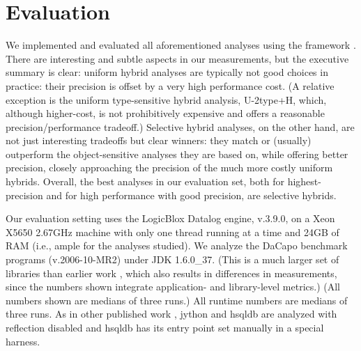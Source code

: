 

\section{Evaluation}
\label{sec:evaluation}

We implemented and evaluated all aforementioned analyses using the
\doop{} framework \cite{oopsla:2009:Bravenboer}. There are interesting and
subtle aspects in our measurements, but the executive summary is
clear: uniform hybrid analyses are typically not good choices in
practice: their precision is offset by a very high performance cost.
(A relative exception is the uniform type-sensitive hybrid analysis,
U-2type+H, which, although higher-cost, is not prohibitively expensive
and offers a reasonable precision/performance tradeoff.)  Selective
hybrid analyses, on the other hand, are not just interesting tradeoffs
but clear winners: they match or (usually) outperform the
object-sensitive analyses they are based on, while offering better
precision, closely approaching the precision of the much more costly
uniform hybrids. Overall, the best analyses in our evaluation set,
both for highest-precision and for high performance with good
precision, are selective hybrids.

Our evaluation setting uses the LogicBlox Datalog engine, v.3.9.0, on
a Xeon X5650 2.67GHz machine with only one thread running at a time
and 24GB of RAM (i.e., ample for the analyses studied). We analyze the
DaCapo benchmark programs (v.2006-10-MR2) under JDK 1.6.0\_37. (This
is a much larger set of libraries than earlier work
\cite{oopsla:2009:Bravenboer,popl:2011:Smaragdakis}, which also results in differences
in measurements, since the numbers shown integrate application- and
library-level metrics.) (All numbers shown are medians of three runs.)
All runtime numbers are medians of three runs. As in other published
work \cite{popl:2011:Smaragdakis,ecoop:2012:Ali}, jython and hsqldb are
analyzed with reflection disabled and hsqldb has its entry point set
manually in a special harness.

